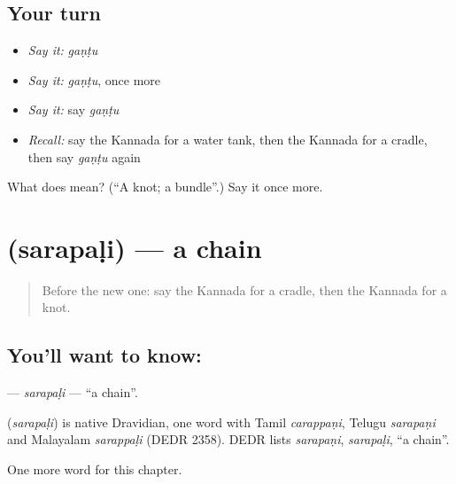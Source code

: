 \subsection*{Your turn}
\begin{itemize}
\raggedright
  \item \emph{Say it:} \emph{gaṇṭu}
  \item \emph{Say it:} \emph{gaṇṭu}, once more
  \item \emph{Say it:} say \emph{gaṇṭu}
  \item \emph{Recall:} say the Kannada for a water tank, then the Kannada for a cradle, then say \emph{gaṇṭu} again
\end{itemize}

\begin{tcolorbox}[breakable,colback=teal!4,colframe=teal!35!black,title={Before you move on}]
What does  mean? (\textquotedblleft{}A knot; a bundle\textquotedblright{}.) Say it once more.
\end{tcolorbox}
\section[\texorpdfstring{\kn{ಸರಪಳಿ} (sarapaḷi)}{ಸರಪಳಿ (sarapaḷi)}]{ (sarapaḷi) — a chain}

\label{lesson:KA-C229-sarapali}



\begin{quote}
Before the new one: say the Kannada for a cradle, then the Kannada for a knot.
\end{quote}

\subsection*{You'll want to know: }
\textbf{} — \emph{sarapaḷi} — \textquotedblleft{}a chain\textquotedblright{}.

\begin{cousinweb}
\textbf{} (\emph{sarapaḷi}) is native Dravidian, one word with Tamil \emph{carappaṇi}, Telugu \emph{sarapaṇi} and Malayalam \emph{sarappaḷi} (DEDR 2358). DEDR lists \emph{sarapaṇi}, \emph{sarapaḷi}, \textquotedblleft{}a chain\textquotedblright{}.
\end{cousinweb}

\begin{grammarlens}[title={What you've built}]
One more word for this chapter.
\end{grammarlens}

